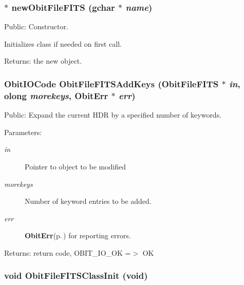 \subsubsection{$\ast$ new\-Obit\-File\-FITS (gchar $\ast$ {\em name})}\label{ObitFileFITS_8h_a4}


Public: Constructor. 

Initializes class if needed on first call. \begin{Desc}
\item[Returns:]the new object. \end{Desc}
\subsubsection{\setlength{\rightskip}{0pt plus 5cm}Obit\-IOCode Obit\-File\-FITSAdd\-Keys ({\bf Obit\-File\-FITS} $\ast$ {\em in}, {\bf olong} {\em morekeys}, {\bf Obit\-Err} $\ast$ {\em err})}\label{ObitFileFITS_8h_a29}


Public: Expand the current HDR by a specified number of keywords. 

\begin{Desc}
\item[Parameters:]
\begin{description}
\item[{\em in}]Pointer to object to be modified \item[{\em morekeys}]Number of keyword entries to be added. \item[{\em err}]{\bf Obit\-Err}{\rm (p.\,\pageref{structObitErr})} for reporting errors. \end{description}
\end{Desc}
\begin{Desc}
\item[Returns:]return code, OBIT\_\-IO\_\-OK =$>$ OK \end{Desc}
\subsubsection{\setlength{\rightskip}{0pt plus 5cm}void Obit\-File\-FITSClass\-Init (void)}\label{ObitFileFITS_8h_a3}


